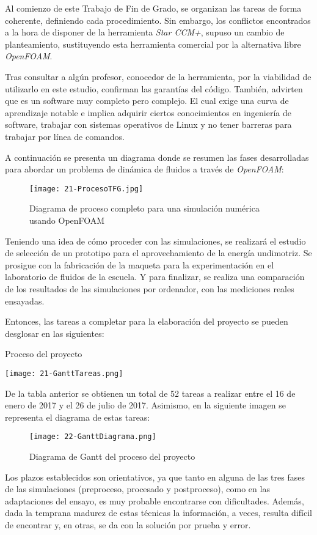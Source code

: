 Al comienzo de este Trabajo de Fin de Grado, se organizan las tareas de
forma coherente, definiendo cada procedimiento. Sin embargo, los
conflictos encontrados a la hora de disponer de la herramienta
\emph{Star CCM+}, supuso un cambio de planteamiento, sustituyendo esta
herramienta comercial por la alternativa libre \emph{OpenFOAM}.

Tras consultar a algún profesor, conocedor de la herramienta, por la
viabilidad de utilizarlo en este estudio, confirman las garantías del
código. También, advirten que es un software muy completo pero complejo.
El cual exige una curva de aprendizaje notable e implica adquirir
ciertos conocimientos en ingeniería de software, trabajar con sistemas
operativos de Linux y no tener barreras para trabajar por línea de
comandos.

A continuación se presenta un diagrama donde se resumen las fases
desarrolladas para abordar un problema de dinámica de fluidos a través
de \emph{OpenFOAM}:\\

\begin{figure}
\centering
\texttt{[image: 21-ProcesoTFG.jpg]}
\caption[Diagrama de proceso]{Diagrama de proceso completo para una simulación
numérica usando OpenFOAM}
\label{fig:ProcesoTFG}
\end{figure}

Teniendo una idea de cómo proceder con las simulaciones, se realizará el
estudio de selección de un prototipo para el aprovechamiento de la
energía undimotriz. Se prosigue con la fabricación de la maqueta para la
experimentación en el laboratorio de fluidos de la escuela. Y para
finalizar, se realiza una comparación de los resultados de las
simulaciones por ordenador, con las mediciones reales ensayadas.

Entonces, las tareas a completar para la elaboración del proyecto se
pueden desglosar en las siguientes:

\begin{table}
\centering
\caption{Proceso del proyecto}
\texttt{[image: 21-GanttTareas.png]}
\end{table}

De la tabla anterior se obtienen un total de 52 tareas a realizar entre
el 16 de enero de 2017 y el 26 de julio de 2017. Asimismo, en la
siguiente imagen se representa el diagrama de estas tareas:

\begin{figure}
\centering
\texttt{[image: 22-GanttDiagrama.png]}
\caption{Diagrama de Gantt del proceso del proyecto}
\label{fig:GanttDiagrama}
\end{figure}

Los plazos establecidos son orientativos, ya que tanto en alguna de las
tres fases de las simulaciones (preproceso, procesado y postproceso),
como en las adaptaciones del ensayo, es muy probable encontrarse con
dificultades. Además, dada la temprana madurez de estas técnicas la
información, a veces, resulta difícil de encontrar y, en otras, se da
con la solución por prueba y error.
